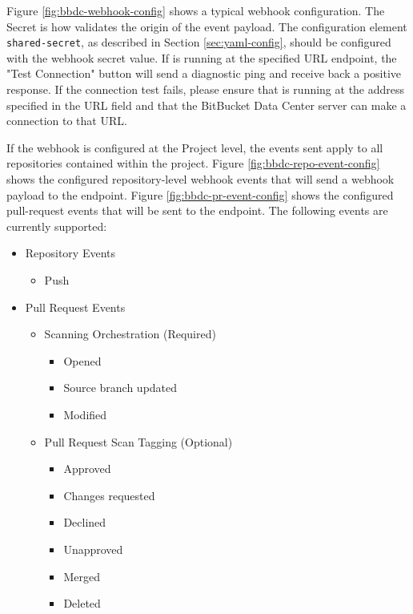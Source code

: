 Figure \ref{fig:bbdc-webhook-config} shows a typical webhook configuration.  The Secret is how \cxoneflow
validates the origin of the event payload.  The configuration element \texttt{shared-secret}, as described
in Section \ref{sec:yaml-config}, should be configured with the webhook secret value.  If \cxoneflow
is running at the specified URL endpoint, the "Test Connection" button will send a diagnostic ping
and receive back a positive response.  If the connection test fails, please ensure that \cxoneflow is running
at the address specified in the URL field and that the BitBucket Data Center server can make a connection
to that URL.

If the webhook is configured at the Project level, the events sent apply to all repositories contained
within the project.  Figure \ref{fig:bbdc-repo-event-config} shows the configured repository-level webhook 
events that will send a webhook payload to the \cxoneflow endpoint. 
Figure \ref{fig:bbdc-pr-event-config} shows the configured pull-request events that will be sent to 
the \cxoneflow endpoint.  The following events are currently supported:


\pagebreak
\begin{itemize}
    \item Repository Events
        \begin{itemize}
            \item Push
        \end{itemize}
    \item Pull Request Events
        \begin{itemize}
            \item Scanning Orchestration (Required)
                \begin{itemize}
                    \item Opened
                    \item Source branch updated
                    \item Modified
                \end{itemize}
        \end{itemize}
        \begin{itemize}
            \item Pull Request Scan Tagging (Optional)
                \begin{itemize}
                    \item Approved
                    \item Changes requested
                    \item Declined
                    \item Unapproved
                    \item Merged
                    \item Deleted
                \end{itemize}
        \end{itemize}

\end{itemize}


